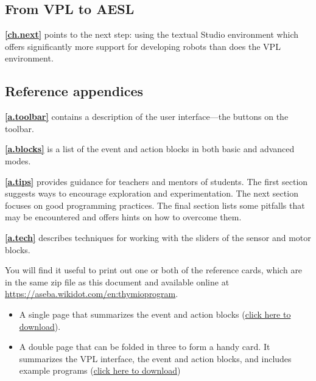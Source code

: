 \medskip

\subsection*{From VPL to AESL}

\textbf{\cref{ch.next}} points to the next step: using the
textual Studio environment which offers significantly more support for
developing robots than does the VPL environment.


\subsection*{Reference appendices}

\textbf{\cref{a.toolbar}} contains a description of the user
interface---the buttons on the toolbar.

\textbf{\cref{a.blocks}} is a list of the event and
action blocks in both basic and advanced modes.

\textbf{\cref{a.tips}} provides guidance for teachers and
mentors of students. The first section suggests ways to encourage
exploration and experimentation. The next section focuses on good
programming practices. The final section lists some pitfalls that may be
encountered and offers hints on how to overcome them.

\textbf{\cref{a.tech}} describes techniques for working with the
sliders of the sensor and motor blocks.

 \quad {}



You will find it useful to print out one or both of the reference cards,
which are in the same zip file as this document and available
online at \url{https://aseba.wikidot.com/en:thymioprogram}.

\begin{itemize}
\item A single page that summarizes the event and action blocks
(\href{https://aseba.wdfiles.com/local--files/en:thymioprogram/thymio-vpl-ref-card-en.pdf}{click here to download}).
\item A double page that can be folded in three to form a handy card.
It summarizes the VPL interface, the event and action blocks,
and includes example programs
(\href{https://aseba.wdfiles.com/local--files/en:thymioprogram/thymio-vpl-folding-ref-card-en.pdf}{click here to download})
\end{itemize}
